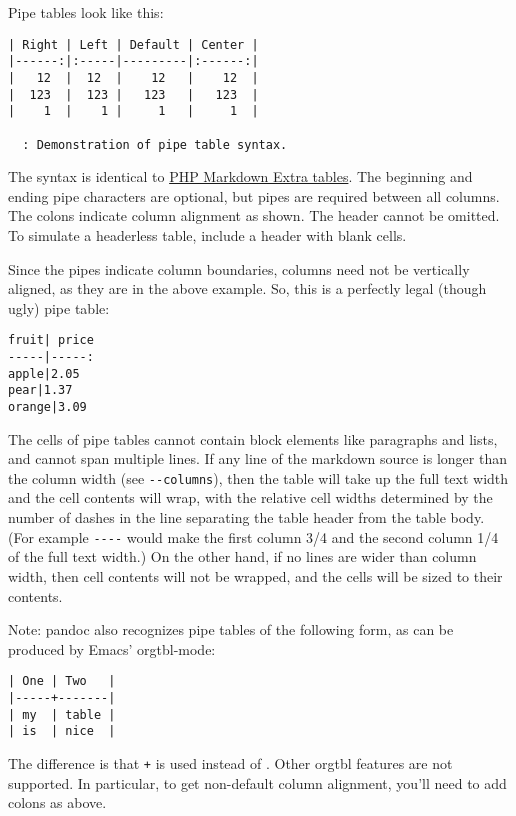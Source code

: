 \documentclass[
  a4paper,
]{article}
\begin{document}
Pipe tables look like this:

\begin{verbatim}
| Right | Left | Default | Center |
|------:|:-----|---------|:------:|
|   12  |  12  |    12   |    12  |
|  123  |  123 |   123   |   123  |
|    1  |    1 |     1   |     1  |

  : Demonstration of pipe table syntax.
\end{verbatim}

The syntax is identical to
\href{https://michelf.ca/projects/php-markdown/extra/\#table}{PHP
Markdown Extra tables}. The beginning and ending pipe characters are
optional, but pipes are required between all columns. The colons
indicate column alignment as shown. The header cannot be omitted. To
simulate a headerless table, include a header with blank cells.

Since the pipes indicate column boundaries, columns need not be
vertically aligned, as they are in the above example. So, this is a
perfectly legal (though ugly) pipe table:

\begin{verbatim}
fruit| price
-----|-----:
apple|2.05
pear|1.37
orange|3.09
\end{verbatim}

The cells of pipe tables cannot contain block elements like paragraphs
and lists, and cannot span multiple lines. If any line of the markdown
source is longer than the column width (see \texttt{-\/-columns}), then
the table will take up the full text width and the cell contents will
wrap, with the relative cell widths determined by the number of dashes
in the line separating the table header from the table body. (For
example \texttt{-\/-\/-\textbar{}-} would make the first column 3/4 and
the second column 1/4 of the full text width.) On the other hand, if no
lines are wider than column width, then cell contents will not be
wrapped, and the cells will be sized to their contents.

Note: pandoc also recognizes pipe tables of the following form, as can
be produced by Emacs' orgtbl-mode:

\begin{verbatim}
| One | Two   |
|-----+-------|
| my  | table |
| is  | nice  |
\end{verbatim}

The difference is that \texttt{+} is used instead of
\texttt{\textbar{}}. Other orgtbl features are not supported. In
particular, to get non-default column alignment, you'll need to add
colons as above.
\end{document}
